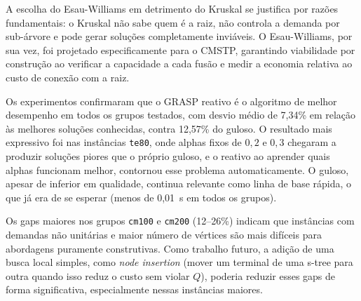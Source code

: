 \documentclass[12pt, a4paper]{article}
\begin{document}
A escolha do Esau-Williams em detrimento do Kruskal se justifica por razões fundamentais: o Kruskal não sabe quem é a raiz, não controla a demanda por sub-árvore e pode gerar soluções completamente inviáveis. O Esau-Williams, por sua vez, foi projetado especificamente para o CMSTP, garantindo viabilidade por construção ao verificar a capacidade a cada fusão e medir a economia relativa ao custo de conexão com a raiz.

Os experimentos confirmaram que o GRASP reativo é o algoritmo de melhor desempenho em todos os grupos testados, com desvio médio de 7,34\% em relação às melhores soluções conhecidas, contra 12,57\% do guloso. O resultado mais expressivo foi nas instâncias \texttt{te80}, onde alphas fixos de $0{,}2$ e $0{,}3$ chegaram a produzir soluções piores que o próprio guloso, e o reativo ao aprender quais alphas funcionam melhor, contornou esse problema automaticamente. O guloso, apesar de inferior em qualidade, continua relevante como linha de base rápida, o que já era de se esperar (menos de 0,01~s em todos os grupos).

Os gaps maiores nos grupos \texttt{cm100} e \texttt{cm200} (12--26\%) indicam que instâncias com demandas não unitárias e maior número de vértices são mais difíceis para abordagens puramente construtivas. Como trabalho futuro, a adição de uma busca local simples, como \textit{node insertion} (mover um terminal de uma s-tree para outra quando isso reduz o custo sem violar $Q$), poderia reduzir esses gaps de forma significativa, especialmente nessas instâncias maiores.
\end{document}

